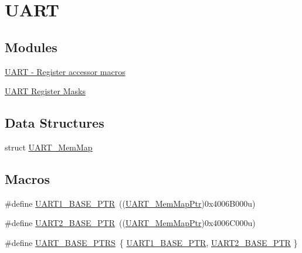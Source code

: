 \hypertarget{group___u_a_r_t___peripheral}{}\section{U\+A\+RT}
\label{group___u_a_r_t___peripheral}
\subsection*{Modules}
\begin{DoxyCompactItemize}
\item 
\hyperlink{group___u_a_r_t___register___accessor___macros}{U\+A\+R\+T -\/ Register accessor macros}
\item 
\hyperlink{group___u_a_r_t___register___masks}{U\+A\+R\+T Register Masks}
\end{DoxyCompactItemize}
\subsection*{Data Structures}
\begin{DoxyCompactItemize}
\item 
struct \hyperlink{struct_u_a_r_t___mem_map}{U\+A\+R\+T\+\_\+\+Mem\+Map}
\end{DoxyCompactItemize}
\subsection*{Macros}
\begin{DoxyCompactItemize}
\item 
\#define \hyperlink{group___u_a_r_t___peripheral_gafb5b1236c1cdf2d9a6464251b791030c}{U\+A\+R\+T1\+\_\+\+B\+A\+S\+E\+\_\+\+P\+TR}~((\hyperlink{group___u_a_r_t___peripheral_ga306cf44b593fadbb29a065f42e3f68f0}{U\+A\+R\+T\+\_\+\+Mem\+Map\+Ptr})0x4006\+B000u)
\item 
\#define \hyperlink{group___u_a_r_t___peripheral_ga75ca2ea4e490b3c1c7aa55fc9c25cd37}{U\+A\+R\+T2\+\_\+\+B\+A\+S\+E\+\_\+\+P\+TR}~((\hyperlink{group___u_a_r_t___peripheral_ga306cf44b593fadbb29a065f42e3f68f0}{U\+A\+R\+T\+\_\+\+Mem\+Map\+Ptr})0x4006\+C000u)
\item 
\#define \hyperlink{group___u_a_r_t___peripheral_ga7b34a38b9492a1e1007b2f66383aef17}{U\+A\+R\+T\+\_\+\+B\+A\+S\+E\+\_\+\+P\+T\+RS}~\{ \hyperlink{group___u_a_r_t___peripheral_gafb5b1236c1cdf2d9a6464251b791030c}{U\+A\+R\+T1\+\_\+\+B\+A\+S\+E\+\_\+\+P\+TR}, \hyperlink{group___u_a_r_t___peripheral_ga75ca2ea4e490b3c1c7aa55fc9c25cd37}{U\+A\+R\+T2\+\_\+\+B\+A\+S\+E\+\_\+\+P\+TR} \}
\end{DoxyCompactItemize}
